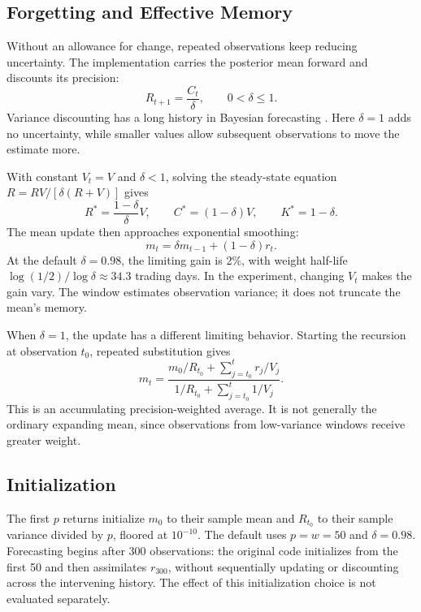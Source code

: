 \documentclass[conference]{IEEEtran}
\begin{document}
\subsection{Forgetting and Effective Memory}
Without an allowance for change, repeated observations keep reducing uncertainty. The implementation carries the posterior mean forward and discounts its precision:
\begin{equation}
 R_{t+1}=\frac{C_t}{\delta},\qquad 0<\delta\leq1.
 \label{eq:discount}
\end{equation}
Variance discounting has a long history in Bayesian forecasting \cite{ameen}. Here $\delta=1$ adds no uncertainty, while smaller values allow subsequent observations to move the estimate more.

With constant $V_t=V$ and $\delta<1$, solving the steady-state equation $R=RV/[\delta(R+V)]$ gives
\begin{equation}
 R^*=\frac{1-\delta}{\delta}V,\qquad
 C^*=(1-\delta)V,\qquad K^*=1-\delta.
 \label{eq:steady}
\end{equation}
The mean update then approaches exponential smoothing:
\begin{equation}
 m_t=\delta m_{t-1}+(1-\delta)r_t.
\end{equation}
At the default $\delta=0.98$, the limiting gain is 2\%, with weight half-life $\log(1/2)/\log\delta\approx34.3$ trading days. In the experiment, changing $V_t$ makes the gain vary. The window estimates observation variance; it does not truncate the mean's memory.

When $\delta=1$, the update has a different limiting behavior. Starting the recursion at observation $t_0$, repeated substitution gives
\begin{equation}
 m_t=\frac{m_0/R_{t_0}+\sum_{j=t_0}^{t}r_j/V_j}
 {1/R_{t_0}+\sum_{j=t_0}^{t}1/V_j}.
 \label{eq:noforget}
\end{equation}
This is an accumulating precision-weighted average. It is not generally the ordinary expanding mean, since observations from low-variance windows receive greater weight.

\subsection{Initialization}
The first $p$ returns initialize $m_0$ to their sample mean and $R_{t_0}$ to their sample variance divided by $p$, floored at $10^{-10}$. The default uses $p=w=50$ and $\delta=0.98$. Forecasting begins after 300 observations: the original code initializes from the first 50 and then assimilates $r_{300}$, without sequentially updating or discounting across the intervening history. The effect of this initialization choice is not evaluated separately.
\end{document}
